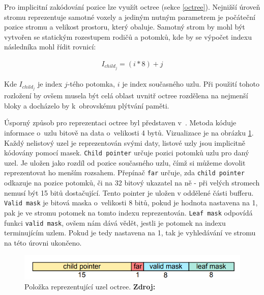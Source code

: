 Pro implicitní zakódování pozice lze využít octree (sekce \ref{octree}). Nejnižší úroveň stromu reprezentuje samotné voxely a jediným nutným parametrem je počáteční pozice stromu a velikost prostoru, který obaluje. Samotný strom by mohl být vytvořen se statickým rozestupem rodičů a potomků, kde by se výpočet indexu následníka mohl řídit rovnicí:

\begin{equation} \label{eq:simple_octree_index}
	\begin{gathered}
		I_{child_j} = (i * 8) + j
	\end{gathered}
\end{equation}

Kde $I_{child_j}$ je index $j$-tého potomka, $i$ je index současného uzlu. Při použití tohoto rozložení by ovšem musela být celá oblast uvnitř octree rozdělena na nejmenší bloky a docházelo by k~obrovskému plýtvání paměti.

Úsporný způsob pro reprezentaci octree byl představen v~\cite{Laine2011EfficientSV}. Metoda kóduje informace o~uzlu bitově na data o~velikosti 4 bytů. Vizualizace je na obrázku \ref{fig:octree_child}. Každý nelistový uzel je reprezentován svými daty, listové uzly jsou implicitně kódovány pomocí masek. \texttt{Child pointer} určuje pozici potomků uzlu pro daný uzel. Je uložen jako rozdíl od pozice současného uzlu, čímž si můžeme dovolit reprezentovat ho menším rozsahem. Přepínač \texttt{far} určuje, zda \texttt{child pointer} odkazuje na pozice potomků, či na 32 bitový ukazatel na ně - při velých stromech nemusí být 15 bitů dostačující. Tento pointer je uložen v oddělené části bufferu. \texttt{Valid mask} je bitová maska o~velikosti 8 bitů, pokud je hodnota nastavena na 1, pak je ve stromu potomek na tomto indexu reprezentován. \texttt{Leaf mask} odpovídá funkci \texttt{valid mask}, ovšem nám dává vědět, jestli je potomek na indexu terminujícím uzlem. Pokud je tedy nastavena na 1, tak je vyhledávání ve stromu na této úrovni ukončeno.

\begin{figure}[H]
	\centering
	\includegraphics[scale=1.3]{obrazky-figures/octree_child_data.png}
	\caption{Položka reprezentující uzel octree. \textbf{Zdroj: \cite{Laine2011EfficientSV}}}
	\label{fig:octree_child}
\end{figure}

